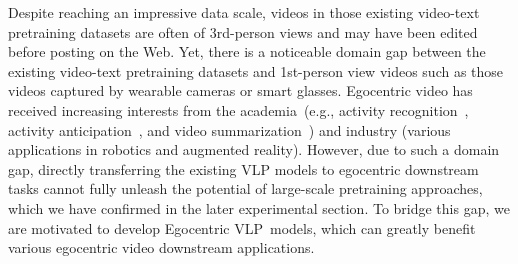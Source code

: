 \documentclass{article}
\newcommand{\vlp}{Egocentric VLP}
\begin{document}
Despite reaching an impressive data scale, videos in those existing video-text pretraining datasets are often of 3rd-person views and may have been edited before posting on the Web.
Yet, there is a noticeable domain gap between the existing video-text pretraining datasets and 1st-person view videos such as those videos captured by wearable cameras or smart glasses.
Egocentric video has received increasing interests from the academia~(e.g., activity recognition~\cite{caba2015activitynet}, activity anticipation~\cite{abu2018will}, and video summarization~\cite{ma2002user}) and industry (various applications in robotics and augmented reality).
However, due to such a domain gap, directly transferring the existing VLP models to egocentric downstream tasks cannot fully unleash the potential of large-scale pretraining approaches, which we have confirmed in the later experimental section.
To bridge this gap, we are motivated to develop \vlp~models, which can greatly benefit various egocentric video downstream applications.
\end{document}
